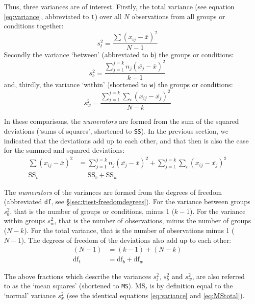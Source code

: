 \documentclass[
]{book}
\begin{document}
Thus, three variances are of interest. Firstly, the total
variance (see equation
\eqref{eq:variance}, abbreviated to \texttt{t}) over all \(N\)
observations from all groups or conditions together:
\begin{equation}
  \label{eq:MStotal}
    s^2_t = \frac{ \sum (x_{ij} - \overline{x})^2 } {N-1}
\end{equation}
Secondly the variance `between' (abbreviated to \texttt{b}) the groups
or conditions:
\begin{equation}
  \label{eq:MSbetween}
    s^2_b = \frac{ \sum_{j=1}^{j=k} n_j (\overline{x_j} - \overline{x})^2 } {k-1}
\end{equation}
and, thirdly, the variance `within' (shortened to \texttt{w}) the groups or
conditions:
\begin{equation}
  \label{eq:MSwithin}
    s^2_w = \frac{ \sum_{j=1}^{j=k} \sum_i (x_{ij} - \overline{x_j})^2 } {N-k}
\end{equation}

In these comparisons, the \emph{numerators} are formed from the sum of
the squared deviations (`sums of squares', shortened to \texttt{SS}). In the
previous section, we indicated that the deviations add up to each other,
and that then is also the case for the summed and squared
deviations:
\begin{align}
  \label{eq:SStotal}
    { \sum (x_{ij} - \overline{x})^2 } &= 
    { \sum_{j=1}^{j=k} n_j (\overline{x_j} - \overline{x})^2 } + 
    { \sum_{j=1}^{j=k} \sum_i (x_{ij} - \overline{x_j})^2 } \\
    \textrm{SS}_t &= \textrm{SS}_b + \textrm{SS}_w
\end{align}

The
\emph{numerators} of the variances are formed from the degrees of freedom
(abbreviated \texttt{df}, see
§\ref{sec:ttest-freedomdegrees}). For the variance between
groups \(s^2_b\), that is the number of groups or conditions, minus 1 (\(k-1\)).
For the variance within groups \(s^2_w\), that is the number of observations,
minus the number of groups (\(N-k\)). For the total variance, that is the
number of observations minus 1 (\(N-1\)). The degrees of freedom of the
deviations also add up to each other:
\begin{align}
  \label{eq:dftotal1}
    { (N-1) } &= { (k-1) } + { (N-k) } \\
    \textrm{df}_t &= \textrm{df}_b + \textrm{df}_w
\end{align}

The above fractions which describe the variances \(s^2_t\), \(s^2_b\) and \(s^2_w\),
are also referred to as the `mean squares' (shortened to \texttt{MS}).
\(\textrm{MS}_{t}\) is by definition equal to the `normal' variance
\(s^2_x\) (see the identical equations
\eqref{eq:variance} and
\eqref{eq:MStotal}).
\end{document}
